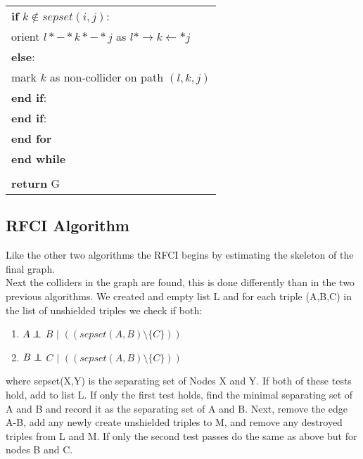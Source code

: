 \documentclass{article}
\newcommand\independent{\protect\mathpalette{\protect\independenT}{\perp}}
\def\independenT#1#2{\mathrel{\rlap{$#1#2$}\mkern2mu{#1#2}}}
\begin{document}
\begin{longtable}{|l l|}
		\multicolumn{2}{|l|}{\quad\quad\quad \textbf{if} $k \notin sepset(i,j)$:}\\
		
		\multicolumn{2}{|l|}{\quad\quad\quad\quad orient $l *-* k *-*j$ as $l *\rightarrow k \leftarrow * j$}\\
		
		\multicolumn{2}{|l|}{\quad\quad\quad \textbf{else}: }\\
		\multicolumn{2}{|l|}{\quad\quad\quad\quad mark $k$ as non-collider on path $(l,k,j)$ }\\
		\multicolumn{2}{|l|}{\quad\quad\quad \textbf{end if}: }\\
		\multicolumn{2}{|l|}{\quad\quad \textbf{end if}: }\\
		\multicolumn{2}{|l|}{\quad\textbf{end for}}\\
		\multicolumn{2}{|l|}{\textbf{end while}}\\
		&\\
		\multicolumn{2}{|l|}{\textbf{return} G}\\
		\hline 
	\end{longtable}

\subsection{RFCI Algorithm}
Like the other two algorithms the RFCI begins by estimating the skeleton of the final graph.
\\

Next the colliders in the graph are found, this is done differently than in the two previous algorithms. We created and empty list L and for each triple (A,B,C) in the list of unshielded triples we check if both:
\\

\begin{enumerate}[i]
	\item $A \independent$ $B$ $|$ $((sepset(A,B) \setminus \{C\}))$
	\item $B \independent$ $C$ $|$ $((sepset(A,B) \setminus \{C\}))$\end{enumerate}
where sepset(X,Y) is the separating set of Nodes X and Y. If both of these tests hold, add to list L. If only the first test holds, find the minimal separating set of A and B and record it as the separating set of A and B. Next, remove the edge A-B, add any newly create unshielded triples to M, and remove any destroyed triples from L and M. If only the second test passes do the same as above but for nodes B and C.
\\
\end{document}
